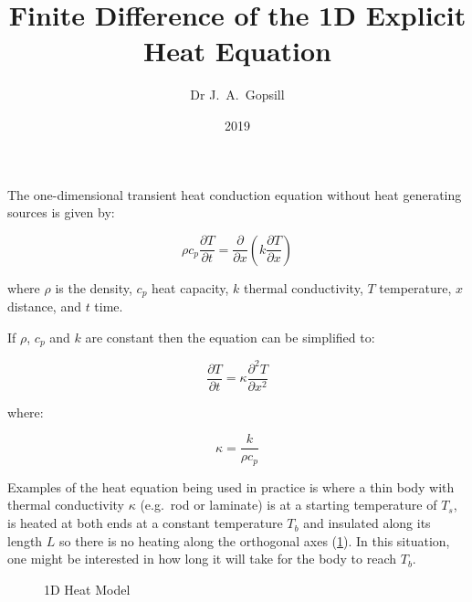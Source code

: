\documentclass[a4page, twocolumn, twoside, 11pt]{article}
\title{Finite Difference of the 1D Explicit Heat Equation}
\author{Dr J.\ A.\ Gopsill}
\date{2019}
\begin{document}
\maketitle


The one-dimensional transient heat conduction equation without heat generating sources is given by:

\begin{equation}
  \rho c_p \frac{\partial T}{\partial t} = \frac{\partial}{\partial x}\left(k\frac{\partial T}{\partial x}\right)
\end{equation}

\noindent where $\rho$ is the density, $c_p$ heat capacity, $k$ thermal conductivity, $T$ temperature, $x$ distance, and $t$ time.

If $\rho$, $c_p$ and $k$ are constant then the equation can be simplified to:

\begin{equation}
  \frac{\partial T}{\partial t} = \kappa\frac{\partial^2 T}{\partial x^2}
  \label{equ:1d-equation}
\end{equation}

\noindent where:

\begin{equation}
  \kappa = \frac{k}{\rho c_p}
\end{equation}

Examples of the heat equation being used in practice is where a thin body with thermal conductivity $\kappa$ (e.g.\ rod or laminate) is at a starting temperature of $T_s$, is heated at both ends at a constant temperature $T_b$ and insulated along its length $L$ so there is no heating along the orthogonal axes (\cref{fig:model}). In this situation, one might be interested in how long it will take for the body to reach $T_b$.

\begin{figure}
  \centering
  \caption{1D Heat Model}\label{fig:model}
\end{figure}
\end{document}
